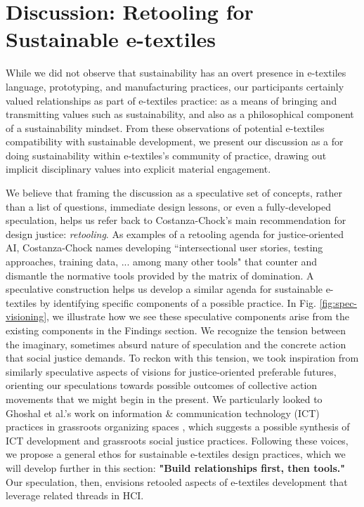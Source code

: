 \section{Discussion: Retooling for Sustainable e-textiles}
While we did not observe that sustainability has an overt presence in e-textiles language, prototyping, and manufacturing practices, our participants certainly valued relationships as part of e-textiles practice: as a means of bringing and transmitting values such as sustainability, and also as a philosophical component of a sustainability mindset. From these observations of potential e-textiles compatibility with sustainable development, we present our discussion as a %
 for doing sustainability within e-textiles's community of practice, drawing out implicit disciplinary values into explicit material engagement. 

We believe that framing the discussion as a speculative set of concepts, rather than a list of questions, immediate design lessons, or even a fully-developed speculation, helps us refer back to Costanza-Chock's main recommendation for design justice: \textit{retooling}. As examples of a retooling agenda for justice-oriented AI, Costanza-Chock names developing ``intersectional user stories, testing approaches, training data, ... among many other tools" \cite{costanza-chock_design_2020} that counter and dismantle the normative tools provided by the matrix of domination. A speculative construction helps us develop a similar agenda for sustainable e-textiles by identifying specific components of a possible practice. In Fig. \ref{fig:spec-visioning}, we illustrate how we see these speculative components arise from the existing components in the Findings section. We recognize the tension between the imaginary, sometimes absurd nature of speculation and the concrete action that social justice demands. To reckon with this tension, we took inspiration from similarly speculative aspects of visions for justice-oriented preferable futures, orienting our speculations towards possible outcomes of collective action movements that we might begin in the present. We particularly looked to Ghoshal et al.'s work on information \& communication technology (ICT) practices in grassroots organizing spaces \cite{ghoshal_toward_2020}, which suggests a possible synthesis of ICT development and grassroots social justice practices. Following these voices, we propose a general ethos for sustainable e-textiles design practices, which we will develop further in this section: \textbf{"Build relationships first, then tools."} 
Our speculation, then, envisions retooled aspects of e-textiles development that leverage related threads in HCI. 




